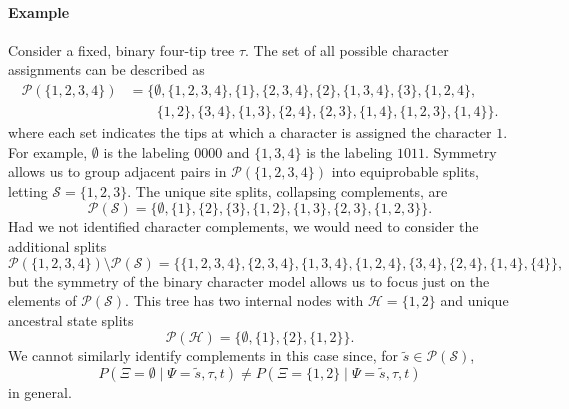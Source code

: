 \documentclass[a4paper]{article}
\newcommand{\siteSplit}{\tilde{s}}
\newcommand{\siteSplitSet}{\mathcal{S}}
\newcommand{\ancestralSplitSet}{\mathcal{H}}
\newcommand{\siteSplitRV}{\Psi}
\newcommand{\ancestralSplitRV}{\Xi}
\begin{document}
\paragraph{Example}
Consider a fixed, binary four-tip tree $\tau$.
The set of all possible character assignments can be described as
\begin{align*}
\mathcal{P}(\{1,2,3,4\}) &= \{\emptyset, \{1,2,3,4\}, \{1\}, \{2,3,4\}, \{2\}, \{1,3,4\}, \{3\}, \{1,2,4\}, \\
                         &\qquad \{1,2\}, \{3,4\}, \{1,3\}, \{2,4\}, \{2,3\}, \{1,4\}, \{1,2,3\}, \{1,4\}\}.
\end{align*}
where each set indicates the tips at which a character is assigned the character $1$.
For example, $\emptyset$ is the labeling $0000$ and $\{1,3,4\}$ is the labeling $1011$.
Symmetry allows us to group adjacent pairs in $\mathcal{P}(\{1,2,3,4\})$ into equiprobable splits, letting $\siteSplitSet=\{1,2,3\}$.
The unique site splits, collapsing complements, are
$$
\mathcal{P}(\siteSplitSet) = \{\emptyset, \{1\}, \{2\}, \{3\}, \{1,2\}, \{1,3\}, \{2,3\}, \{1,2,3\}\}.
$$
Had we not identified character complements, we would need to consider the additional splits
$$
\mathcal{P}(\{1,2,3,4\}) \setminus \mathcal{P}(\siteSplitSet) = \{\{1,2,3,4\}, \{2,3,4\}, \{1,3,4\}, \{1,2,4\}, \{3,4\}, \{2,4\}, \{1,4\}, \{4\}\},
$$
but the symmetry of the binary character model allows us to focus just on the elements of $\mathcal{P}(\siteSplitSet)$.
This tree has two internal nodes with $\ancestralSplitSet=\{1,2\}$ and unique ancestral state splits
$$
\mathcal{P}(\ancestralSplitSet) = \{\emptyset, \{1\}, \{2\}, \{1,2\}\}.
$$
We cannot similarly identify complements in this case since, for $\siteSplit\in\mathcal{P}(\siteSplitSet)$,
$$
P(\ancestralSplitRV=\emptyset \mid \siteSplitRV=\siteSplit, \tau, t)\neq P(\ancestralSplitRV=\{1,2\} \mid \siteSplitRV=\siteSplit, \tau, t)
$$
in general.
\end{document}
